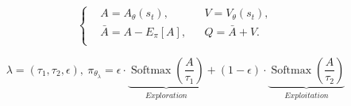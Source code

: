 \documentclass[nohyperref]{article}
\theoremstyle{plain}
\begin{document}
\begin{equation}
\label{Equ: i3 casa equ}
    \left\{
    \begin{aligned}
        &A=A_{\theta}\left(s_{t}\right),& 
        &V=V_{\theta}\left(s_{t}\right), \\
        &\bar{A}=A-E_{\pi}[A],& 
        &Q=\bar{A}+V. \\
    \end{aligned}
    \right.
\end{equation}

\begin{equation}
\label{Equ: i3 soft entropy}
    \lambda = (\tau_1, \tau_2, \epsilon), \ 
    \pi_{\theta_{\lambda}}=\epsilon \cdot \underbrace{\operatorname{Softmax}\left(\frac{A}{\tau_{1}}\right)}_{Exploration}+(1-\epsilon) \cdot \underbrace{\operatorname{Softmax}\left(\frac{A}{\tau_{2}}\right)}_{Exploitation}
\end{equation}
\end{document}

